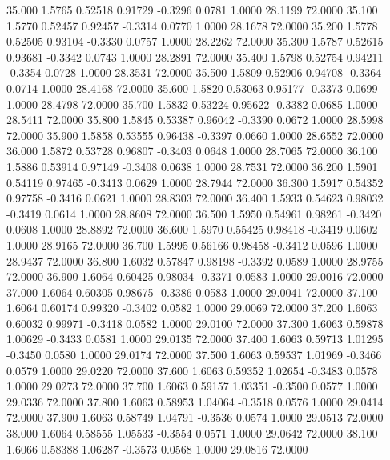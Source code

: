   35.000   1.5765   0.52518   0.91729  -0.3296   0.0781   1.0000  28.1199  72.0000
  35.100   1.5770   0.52457   0.92457  -0.3314   0.0770   1.0000  28.1678  72.0000
  35.200   1.5778   0.52505   0.93104  -0.3330   0.0757   1.0000  28.2262  72.0000
  35.300   1.5787   0.52615   0.93681  -0.3342   0.0743   1.0000  28.2891  72.0000
  35.400   1.5798   0.52754   0.94211  -0.3354   0.0728   1.0000  28.3531  72.0000
  35.500   1.5809   0.52906   0.94708  -0.3364   0.0714   1.0000  28.4168  72.0000
  35.600   1.5820   0.53063   0.95177  -0.3373   0.0699   1.0000  28.4798  72.0000
  35.700   1.5832   0.53224   0.95622  -0.3382   0.0685   1.0000  28.5411  72.0000
  35.800   1.5845   0.53387   0.96042  -0.3390   0.0672   1.0000  28.5998  72.0000
  35.900   1.5858   0.53555   0.96438  -0.3397   0.0660   1.0000  28.6552  72.0000
  36.000   1.5872   0.53728   0.96807  -0.3403   0.0648   1.0000  28.7065  72.0000
  36.100   1.5886   0.53914   0.97149  -0.3408   0.0638   1.0000  28.7531  72.0000
  36.200   1.5901   0.54119   0.97465  -0.3413   0.0629   1.0000  28.7944  72.0000
  36.300   1.5917   0.54352   0.97758  -0.3416   0.0621   1.0000  28.8303  72.0000
  36.400   1.5933   0.54623   0.98032  -0.3419   0.0614   1.0000  28.8608  72.0000
  36.500   1.5950   0.54961   0.98261  -0.3420   0.0608   1.0000  28.8892  72.0000
  36.600   1.5970   0.55425   0.98418  -0.3419   0.0602   1.0000  28.9165  72.0000
  36.700   1.5995   0.56166   0.98458  -0.3412   0.0596   1.0000  28.9437  72.0000
  36.800   1.6032   0.57847   0.98198  -0.3392   0.0589   1.0000  28.9755  72.0000
  36.900   1.6064   0.60425   0.98034  -0.3371   0.0583   1.0000  29.0016  72.0000
  37.000   1.6064   0.60305   0.98675  -0.3386   0.0583   1.0000  29.0041  72.0000
  37.100   1.6064   0.60174   0.99320  -0.3402   0.0582   1.0000  29.0069  72.0000
  37.200   1.6063   0.60032   0.99971  -0.3418   0.0582   1.0000  29.0100  72.0000
  37.300   1.6063   0.59878   1.00629  -0.3433   0.0581   1.0000  29.0135  72.0000
  37.400   1.6063   0.59713   1.01295  -0.3450   0.0580   1.0000  29.0174  72.0000
  37.500   1.6063   0.59537   1.01969  -0.3466   0.0579   1.0000  29.0220  72.0000
  37.600   1.6063   0.59352   1.02654  -0.3483   0.0578   1.0000  29.0273  72.0000
  37.700   1.6063   0.59157   1.03351  -0.3500   0.0577   1.0000  29.0336  72.0000
  37.800   1.6063   0.58953   1.04064  -0.3518   0.0576   1.0000  29.0414  72.0000
  37.900   1.6063   0.58749   1.04791  -0.3536   0.0574   1.0000  29.0513  72.0000
  38.000   1.6064   0.58555   1.05533  -0.3554   0.0571   1.0000  29.0642  72.0000
  38.100   1.6066   0.58388   1.06287  -0.3573   0.0568   1.0000  29.0816  72.0000
